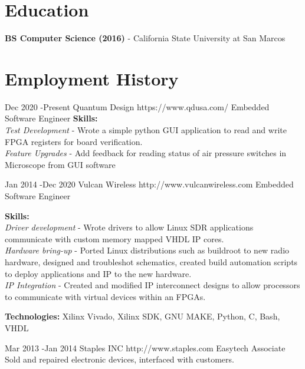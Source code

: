 \documentclass[10pt]{article} %
\begin{document}
\section{Education}

\textbf{BS Computer Science (2016)} - California State University at San Marcos




\section{Employment History}

\job
{Dec 2020 -}{Present}
{Quantum Design}
{https://www.qdusa.com/}
{Embedded Software Engineer}
{\textbf{Skills:}\\
\textit{Test Development} - Wrote a simple python GUI application to read and write FPGA registers for board verification. \\
\textit{Feature Upgrades} - Add feedback for reading status of air pressure switches in Microscope from GUI software \\
}

\job
{Jan 2014 -}{Dec 2020}
{Vulcan Wireless}
{http://www.vulcanwireless.com}
{Embedded Software Engineer}
{\textbf{Skills:}\\
\textit{Driver development} - Wrote drivers to allow Linux SDR applications communicate with custom memory mapped VHDL IP cores. \\
\textit{Hardware bring-up} - Ported Linux distributions such as buildroot to new radio hardware, designed and troubleshot schematics, created build automation scripts to deploy applications and IP to the new hardware.\\
\textit{IP Integration} - Created and modified IP interconnect designs to allow processors to communicate with virtual devices within an FPGAs.\\
\rule{0mm}{5mm}\textbf{Technologies:} Xilinx Vivado, Xilinx SDK, GNU MAKE, Python, C, Bash, VHDL}


\job
{Mar 2013 -}{Jan 2014}
{Staples INC}
{http://www.staples.com}
{Easytech Associate}
{Sold and repaired electronic devices, interfaced with customers.}
\end{document}
